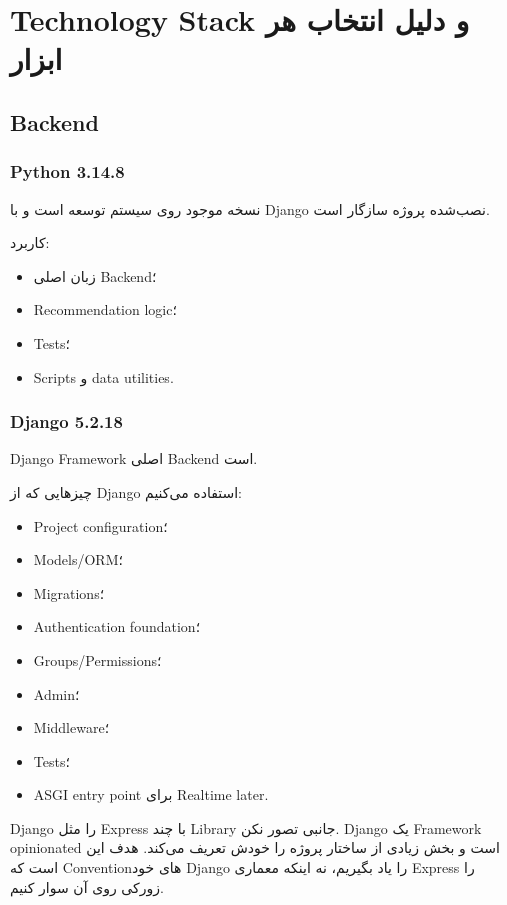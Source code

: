 
\chapter{Technology Stack و دلیل انتخاب هر ابزار}

\section{Backend}

\subsection{Python 3.14.8}

نسخه موجود روی سیستم توسعه  است و با Django نصب‌شده پروژه سازگار است.

کاربرد:
\begin{itemize}
  \item زبان اصلی Backend؛
  \item Recommendation logic؛
  \item Tests؛
  \item Scripts و data utilities.
\end{itemize}

\subsection{Django 5.2.18}

Django Framework اصلی Backend است.

چیزهایی که از Django استفاده می‌کنیم:
\begin{itemize}
  \item Project configuration؛
  \item Models/ORM؛
  \item Migrations؛
  \item Authentication foundation؛
  \item Groups/Permissions؛
  \item Admin؛
  \item Middleware؛
  \item Tests؛
  \item ASGI entry point برای Realtime later.
\end{itemize}

\begin{learningbox}
Django را مثل Express با چند Library جانبی تصور نکن. Django یک Framework opinionated است و بخش زیادی از ساختار پروژه را خودش تعریف می‌کند. هدف این است که Conventionهای خود Django را یاد بگیریم، نه اینکه معماری Express را زورکی روی آن سوار کنیم.
\end{learningbox}

